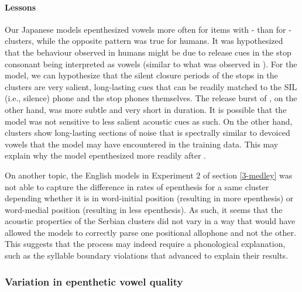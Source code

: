 {\paragraph{Lessons}
Our Japanese models epenthesized vowels more often for items with - than for -clusters, while the opposite pattern was true for humans. It was hypothesized that the behaviour observed in humans might be due to release cues in the stop consonant  being interpreted as vowels (similar to what was observed in \cite{dejong2012}). For the model, we can hypothesize that the silent closure periods of the stops in the  clusters are very salient, long-lasting cues that can be readily matched to the SIL (i.e., silence) phone and the stop phones themselves. The release burst of , on the other hand, was more subtle and very short in duration. It is possible that the model was not sensitive to less salient acoustic cues as such. On the other hand,  clusters show long-lasting sections of noise that is spectrally similar to devoiced vowels that the model may have encountered in the training data. This may explain why the model epenthesized more readily after .

On another topic, the English models in Experiment 2 of section \ref{3-medley} was not able to capture the difference in rates of epenthesis for a same cluster depending whether it is in word-initial position (resulting in more epenthesis) or word-medial position (resulting in less epenthesis). As such, it seems that the acoustic properties of the Serbian clusters did not vary in a way that would have allowed the models to correctly parse one positional allophone and not the other. This suggests that the process may indeed require a phonological explanation, such as the syllable boundary violations that \cite{kabak2007} advanced to explain their results.  

\subsubsection{Variation in epenthetic vowel quality}
}
